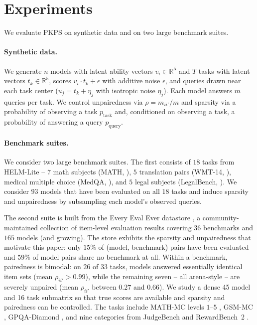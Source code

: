 \documentclass{article}
\theoremstyle{definition}
\theoremstyle{remark}
\theoremstyle{plain}
\newcommand{\PKPS}{PKPS\xspace}
\begin{document}
\section{Experiments}
\label{sec:experiments}
We evaluate \PKPS on synthetic data and on two large benchmark suites.

\paragraph{Synthetic data.} We generate $n$ models with latent ability vectors
$v_i \in \mathbb{R}^{5}$ and $T$ tasks with latent vectors $t_k \in \mathbb{R}^{5}$,
scores $v_i\cdot t_k+\epsilon$ with additive noise $ \epsilon $, and queries drawn near each task center ($u_j = t_k +
\eta_j$ with isotropic noise $\eta_j$).
Each model answers $m$ queries per task. 
We control unpairedness via
$\rho=m_{ii'}/m$ and sparsity via a probability of observing a task
$p_{\mathrm{task}}$ and, conditioned on observing a task, a probability of answering
a query $p_{\mathrm{query}}$.

\paragraph{Benchmark suites.}
We consider two large benchmark suites.
The first consists of $18$ tasks from HELM-Lite \citep{helm} 
-- $7$ math subjects (MATH, \citealp{hendrycks2021math}), $5$ translation pairs
(WMT-14, \citealp{bojar2014wmt}), medical multiple choice
(MedQA, \citealp{jin2021medqa}), and $5$ legal subjects
(LegalBench, \citealp{guha2023legalbench}).
We consider $93$ models that have been evaluated on all $ 18 $ tasks and induce sparsity and unpairedness by subsampling each model's observed queries.

The second suite is built from the Every Eval Ever datastore \citep{eee2026}, a
community-maintained collection of item-level evaluation results covering $36$ benchmarks and $165$ models (and growing).
The store exhibits the sparsity and unpairedness that motivate this paper:
only $15\%$ of (model, benchmark) pairs have been evaluated and $59\%$ of model
pairs share no benchmark at all.
Within a benchmark, pairedness is bimodal: on $26$ of $33$ tasks,
models answered essentially identical item sets (mean $\rho_{ii'}>0.99$), while the
remaining seven -- all arena-style \citep{chiang2024chatbot} -- are severely
unpaired (mean $\rho_{ii'}$ between $0.27$ and $0.66$).
We study a dense 45 model and 16 task submatrix so that true scores are available and
sparsity and pairedness can be controlled.
The tasks include MATH-MC
levels $1$--$5$ \citep{hendrycks2021math}, GSM-MC \citep{cobbe2021gsm8k},
GPQA-Diamond \citep{rein2023gpqa}, and nine categories from JudgeBench
\citep{tan2024judgebench} and RewardBench~2 \citep{malik2025rewardbench2}. 
\end{document}
